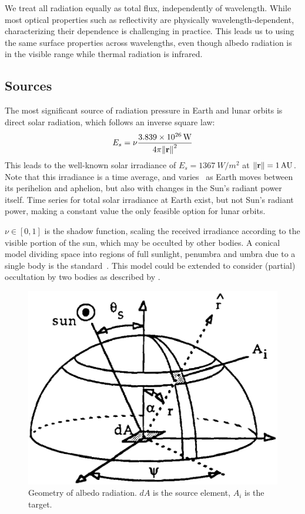 \documentclass[parskip=full,DIV=15]{scrartcl}
\begin{document}
We treat all radiation equally as total flux, independently of wavelength. While most optical properties such as reflectivity are physically wavelength-dependent, characterizing their dependence is challenging in practice. This leads us to using the same surface properties across wavelengths, even though albedo radiation is in the visible range while thermal radiation is infrared.



\subsection{Sources}
The most significant source of radiation pressure in Earth and lunar orbits is direct solar radiation, which follows an inverse square law:
\begin{align}
   E_s = \nu\frac{\SI{3.839e26}{W}}{4\pi \norm{\vb r}^2}
\end{align}
This leads to the well-known solar irradiance of $E_s=\SI{1367}{W/m^2}$ at $\norm{\vb r}=\SI{1}{AU}$. Note that this irradiance is a time average, and varies~\cite{Vielberg2020} as Earth moves between its perihelion and aphelion, but also with changes in the Sun's radiant power itself. Time series for total solar irradiance at Earth exist, but not Sun's radiant power, making a constant value the only feasible option for lunar orbits.

$\nu\in[0,1]$ is the shadow function, scaling the received irradiance according to the visible portion of the sun, which may be occulted by other bodies. A conical model dividing space into regions of full sunlight, penumbra and umbra due to a single body is the standard~\cite{Montenbruck2000}. This model could be extended to consider (partial) occultation by two bodies as described by \textcite{Zhang2019}.

\begin{figure}[ht]
   \centering
   \includegraphics[width=.3\linewidth]{figures/earth_panel_irradiance.png}
   \caption{Geometry of albedo radiation. $dA$ is the source element, $A_i$ is the target.}
   \label{fig:albedo-geometry}
\end{figure}
\end{document}
